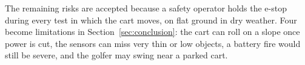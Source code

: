The remaining risks are accepted because a safety operator holds the e-stop during every test in which the cart moves, on flat ground in dry weather. Four become limitations in Section~\ref{sec:conclusion}: the cart can roll on a slope once power is cut, the sensors can miss very thin or low objects, a battery fire would still be severe, and the golfer may swing near a parked cart.
